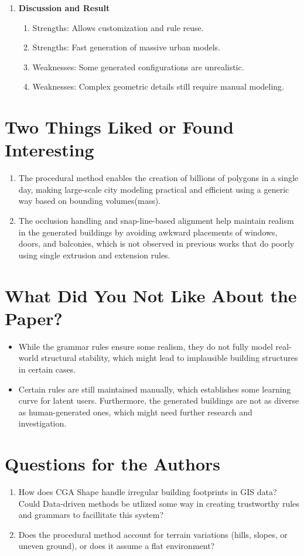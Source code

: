 \documentclass[12pt]{article}
\begin{document}
\begin{enumerate}[noitemsep]
    \item \textbf{Discussion and Result}
    \begin{enumerate}[noitemsep]
        \item Strengths: Allows customization and rule reuse.
        \item Strengths: Fast generation of massive urban models.
        \item Weaknesses: Some generated configurations are unrealistic.
        \item Weaknesses: Complex geometric details still require manual modeling.
    \end{enumerate}
    

\end{enumerate}

\section{Two Things Liked or Found Interesting}
\begin{enumerate}[noitemsep]
    \item The procedural method enables the creation of billions of polygons in a single day, making large-scale city modeling practical and efficient using a generic way based on bounding volumes(mass).
    \item The occlusion handling and snap-line-based alignment help maintain realism in the generated buildings by avoiding awkward placements of windows, doors, and balconies, which is not observed in previous works that do poorly using single extrusion and extension rules.
\end{enumerate}

\section{What Did You Not Like About the Paper?}
\begin{itemize}[noitemsep]
    \item While the grammar rules ensure some realism, they do not fully model real-world structural stability, which might lead to implausible building structures in certain cases.
    \item Certain rules are still maintained manually, which establishes some learning curve for latent users. Furthermore, the generated buildings are not as diverse as human-generated ones, which might need further research and investigation.
\end{itemize}

\section{Questions for the Authors}
\begin{enumerate}[noitemsep]
    \item How does CGA Shape handle irregular building footprints in GIS data? Could Data-driven methods be utlized some way in creating trustworthy rules and grammars to facillitate this system?
    \item Does the procedural method account for terrain variations (hills, slopes, or uneven ground), or does it assume a flat environment? 
\end{enumerate}
\end{document}
